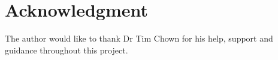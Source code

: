\documentclass[10pt,journal,compsoc]{IEEEtran}
\begin{document}
\section*{Acknowledgment}
The author would like to thank Dr Tim Chown for his help, support and guidance
throughout this project. 



%
%
%
\end{document}
